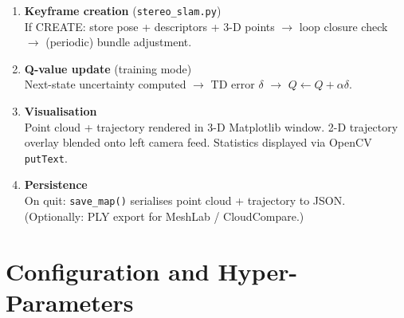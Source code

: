 \documentclass[12pt,a4paper,twoside]{report}
\theoremstyle{definition}
\newcommand{\code}[1]{\texttt{#1}}
\newcommand{\file}[1]{\texttt{\textcolor{codeblue}{#1}}}
\begin{document}
\begin{enumerate}[leftmargin=1.5em, label=\textbf{Step~\arabic*.}]
  \item \textbf{Keyframe creation} (\file{stereo\_slam.py})\\
        If CREATE: store pose + descriptors + 3-D points $\to$ loop closure
        check $\to$ (periodic) bundle adjustment.

  \item \textbf{Q-value update} (training mode)\\
        Next-state uncertainty computed $\to$ TD error $\delta$
        $\to$ $Q \leftarrow Q + \alpha\delta$.

  \item \textbf{Visualisation}\\
        Point cloud + trajectory rendered in 3-D Matplotlib window.
        2-D trajectory overlay blended onto left camera feed.
        Statistics displayed via OpenCV \code{putText}.

  \item \textbf{Persistence}\\
        On quit: \code{save\_map()} serialises point cloud + trajectory to JSON.
        (Optionally: PLY export for MeshLab / CloudCompare.)
\end{enumerate}

\chapter{Configuration and Hyper-Parameters}
\end{document}
